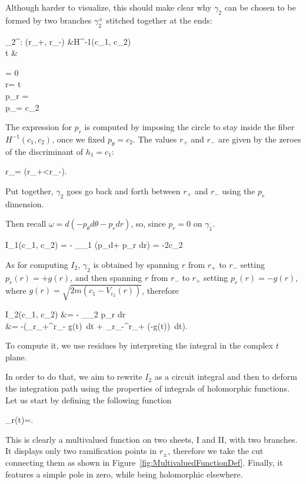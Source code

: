 \documentclass[main.tex]{subfiles}
\begin{document}
\begin{example}
	Although harder to visualize, this should make clear why $\gamma_2$ can be chosen to be formed by two branches $\gamma^\pm_2$ stitched together at the ends:
	\begin{eqalign}
		\gamma_2^\pm : (r_+, r_-) &\longto H^{-1}(c_1, c_2)\\
		t &\longmapsto \begin{cases}
			\theta = 0  \\
			r= \pm t\\
			p_r = \pm {}\\
			p_\theta = c_2
		\end{cases}
	\end{eqalign}
	The expression for $p_r$ is computed by imposing the circle to stay inside the fiber $H^{-1}(c_1, c_2)$, once we fixed $p_\theta=c_2$.
	The values $r_+$ and $r_-$ are given by the zeroes of the discriminant of $h_1=c_1$:
	\begin{eqalign}
	 r_\pm =  \qquad (r_+<r_-).
	\end{eqalign}

	Put together, $\gamma_2$ goes go back and forth between $r_+$ and $r_-$ using the $p_r$ dimension.

	Then recall $\omega = d(-p_\theta d\theta - p_rdr)$, so, since $p_r=0$ on $\gamma_1$.
	\begin{eqalign}
		I_1(c_1, c_2) = - \int_{\gamma_1} (p_\theta d\theta + p_r dr) = -2\pi c_2
	\end{eqalign}
	As for computing $I_2$, $\gamma_2$ is obtained by spanning $r$ from $r_+$ to $r_-$ setting $p_r(r)=+g(r)$,
	and then spanning $r$ from $r_-$ to $r_+$ setting $p_r(r)=-g(r)$, where $g(r)=\sqrt{2m(c_1-V_{c_2}(r))}$, therefore
	\begin{eqalign}
		I_2(c_1, c_2) &= - \int_{\gamma_2} p_r dr \\
			      &= -\left(\int_{r_+}^{r_-} g(t) \,dt + \int_{r_-}^{r_+} (-g(t)) \,dt\right).
	\end{eqalign}
	To compute it, we use residues by interpreting the integral in the complex $t$ plane.

	In order to do that, we aim to rewrite $I_2$ as a circuit integral and then to deform the integration path using
	the properties of integrals of holomorphic functions.
	Let us start by defining the following function
	\begin{eqalign}
	 \pi_r(t)=\sqrt{(t-r_-)(t-r_+)}.
	\end{eqalign}
	This is clearly a multivalued function on two sheets, I and II, with two branches.
	It displays only two ramification points in $r_\pm$, therefore we take the cut connecting them as shown in Figure~\ref{fig:MultivaluedFunctionDef}.
	Finally, it features a simple pole in zero, while being holomorphic elsewhere.


\end{example}
\end{document}
